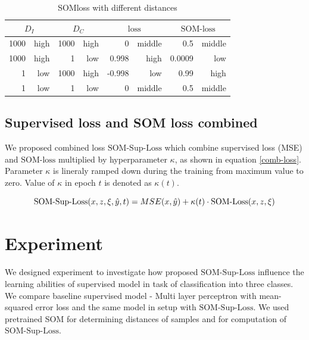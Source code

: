 \begin{table}[ht]
    \centering
    \begin{tabular}{|rr|rr|rr|rr|}
    \hline
    \multicolumn{2}{|c|}{$D_I$}            & \multicolumn{2}{c|}{$D_C$}            & \multicolumn{2}{c|}{$\text{loss}$}                & \multicolumn{2}{c|}{$\text{SOM-loss}$}                \\ \hline
    
    \multicolumn{1}{|r|}{1000} & high & \multicolumn{1}{r|}{1000} & high & \multicolumn{1}{r|}{0}      & middle & \multicolumn{1}{r|}{0.5}    & middle \\ \hline
    
    \multicolumn{1}{|r|}{1000} & high & \multicolumn{1}{r|}{1}    & low  & \multicolumn{1}{r|}{0.998}  & high   & \multicolumn{1}{r|}{0.0009} & low    \\ \hline
    \multicolumn{1}{|r|}{1}    & low  & \multicolumn{1}{r|}{1000} & high & \multicolumn{1}{r|}{-0.998} & low    & \multicolumn{1}{r|}{0.99}   & high   \\ \hline
    \multicolumn{1}{|r|}{1}    & low  & \multicolumn{1}{r|}{1}    & low  & \multicolumn{1}{r|}{0}      & middle & \multicolumn{1}{r|}{0.5}    & middle \\ \hline
    \end{tabular}
    \caption{SOMloss with different distances}
    \label{tab-dists}
\end{table}

\subsection{Supervised loss and SOM loss combined}
We proposed combined loss $\text{SOM-Sup-Loss}$ which combine supervised loss (MSE) and $\text{SOM-loss}$ multiplied by hyperparameter $\kappa$, as shown in equation \ref{comb-loss}.
Parameter $\kappa$ is lineraly ramped down during the training from maximum value to zero. Value of $\kappa$ in epoch $t$ is denoted as $\kappa(t)$.

\begin{equation}
    \text{SOM-Sup-Loss\text{$(x, z, \xi, \hat{y}, t)$}} = MSE(x, \hat{y}) + \kappa(t) \cdot \text{SOM-Loss\text{$(x, z, \xi)$}}
    \label{comb-loss}
\end{equation}

\section{Experiment}
We designed experiment to investigate how proposed $\text{SOM-Sup-Loss}$ influence the learning abilities of supervised model in task of classification into three classes. We compare baseline supervised model - Multi layer perceptron with mean-squared error loss and the same model in setup with $\text{SOM-Sup-Loss}$. We used pretrained SOM for determining distances of samples and for computation of $\text{SOM-Sup-Loss}$.

